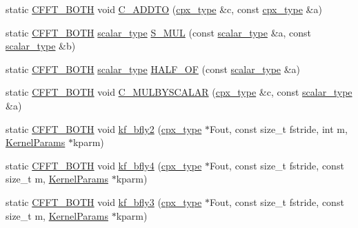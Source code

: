 \begin{DoxyCompactItemize}
\item 
static \hyperlink{cudafft_8h_ac4c6e1a008a73d82e1c532fd74830837}{C\+F\+F\+T\+\_\+\+B\+O\+TH} void \hyperlink{classcudafft_ad4a6c8f97cdf80be567abfceeada59ad}{C\+\_\+\+A\+D\+D\+TO} (\hyperlink{classcudafft_a6b6e4901630f197baf4cf7f165543ece}{cpx\+\_\+type} \&c, const \hyperlink{classcudafft_a6b6e4901630f197baf4cf7f165543ece}{cpx\+\_\+type} \&a)
\item 
static \hyperlink{cudafft_8h_ac4c6e1a008a73d82e1c532fd74830837}{C\+F\+F\+T\+\_\+\+B\+O\+TH} \hyperlink{classcudafft_ac9c43c335102bda3102243f24de11ce6}{scalar\+\_\+type} \hyperlink{classcudafft_a3b3a4acd07911e5e3c27ae34347b7b4e}{S\+\_\+\+M\+UL} (const \hyperlink{classcudafft_ac9c43c335102bda3102243f24de11ce6}{scalar\+\_\+type} \&a, const \hyperlink{classcudafft_ac9c43c335102bda3102243f24de11ce6}{scalar\+\_\+type} \&b)
\item 
static \hyperlink{cudafft_8h_ac4c6e1a008a73d82e1c532fd74830837}{C\+F\+F\+T\+\_\+\+B\+O\+TH} \hyperlink{classcudafft_ac9c43c335102bda3102243f24de11ce6}{scalar\+\_\+type} \hyperlink{classcudafft_ad4779f2e310b7ff2f2633c147e06e17c}{H\+A\+L\+F\+\_\+\+OF} (const \hyperlink{classcudafft_ac9c43c335102bda3102243f24de11ce6}{scalar\+\_\+type} \&a)
\item 
static \hyperlink{cudafft_8h_ac4c6e1a008a73d82e1c532fd74830837}{C\+F\+F\+T\+\_\+\+B\+O\+TH} void \hyperlink{classcudafft_a12bcd921a68025d8b5094bf06221d2c2}{C\+\_\+\+M\+U\+L\+B\+Y\+S\+C\+A\+L\+AR} (\hyperlink{classcudafft_a6b6e4901630f197baf4cf7f165543ece}{cpx\+\_\+type} \&c, const \hyperlink{classcudafft_ac9c43c335102bda3102243f24de11ce6}{scalar\+\_\+type} \&a)
\item 
static \hyperlink{cudafft_8h_ac4c6e1a008a73d82e1c532fd74830837}{C\+F\+F\+T\+\_\+\+B\+O\+TH} void \hyperlink{classcudafft_a1ea7f9333903a6af29c4c7dfdce5a188}{kf\+\_\+bfly2} (\hyperlink{classcudafft_a6b6e4901630f197baf4cf7f165543ece}{cpx\+\_\+type} $\ast$Fout, const size\+\_\+t fstride, int m, \hyperlink{structcudafft_1_1_kernel_params}{Kernel\+Params} $\ast$kparm)
\item 
static \hyperlink{cudafft_8h_ac4c6e1a008a73d82e1c532fd74830837}{C\+F\+F\+T\+\_\+\+B\+O\+TH} void \hyperlink{classcudafft_a5c532f69602cc530be63b3d9567850e5}{kf\+\_\+bfly4} (\hyperlink{classcudafft_a6b6e4901630f197baf4cf7f165543ece}{cpx\+\_\+type} $\ast$Fout, const size\+\_\+t fstride, const size\+\_\+t m, \hyperlink{structcudafft_1_1_kernel_params}{Kernel\+Params} $\ast$kparm)
\item 
static \hyperlink{cudafft_8h_ac4c6e1a008a73d82e1c532fd74830837}{C\+F\+F\+T\+\_\+\+B\+O\+TH} void \hyperlink{classcudafft_aaf70d4484be564eecf99bfb47a90e29e}{kf\+\_\+bfly3} (\hyperlink{classcudafft_a6b6e4901630f197baf4cf7f165543ece}{cpx\+\_\+type} $\ast$Fout, const size\+\_\+t fstride, const size\+\_\+t m, \hyperlink{structcudafft_1_1_kernel_params}{Kernel\+Params} $\ast$kparm)

\end{DoxyCompactItemize}
